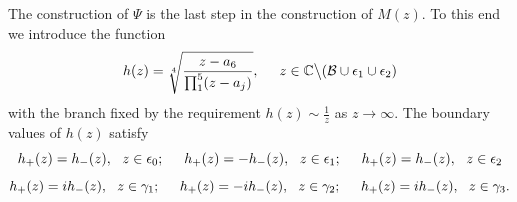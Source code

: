 \documentclass[10pt,oneside,reqno]{amsart}
\numberwithin{equation}{section}
\begin{document}
The construction of $\Psi$ is the last step in the construction of $M(z)$. To this end we introduce the function 
\begin{equation*}
  h(z) = \sqrt[4]{\frac{z-a_6}{\prod_1^5(z-a_j)}},\hspace{0.5cm}z\in\mathbb{C}\big\backslash(\mathcal{B}\cup\epsilon_1\cup\epsilon_2)
\end{equation*}
with the branch fixed by the requirement $h(z)\sim \frac{1}{z}$ as $z\rightarrow\infty$. The boundary values of $h(z)$ satisfy
\begin{equation}\label{hj1}
  h_+(z)=h_-(z),\ \ z\in \epsilon_0;\hspace{0.5cm}h_+(z)=-h_-(z),\ \ z\in\epsilon_1;\hspace{0.5cm}h_+(z)=h_-(z),\ \ z\in\epsilon_2
\end{equation}
\begin{equation}\label{hj2}
 h_+(z)=ih_-(z),\ \ z\in\gamma_1;\hspace{0.5cm}h_+(z)=-ih_-(z),\ \ z\in\gamma_2;\hspace{0.5cm}h_+(z)=ih_-(z),\ \ z\in\gamma_3.
\end{equation}
\end{document}
